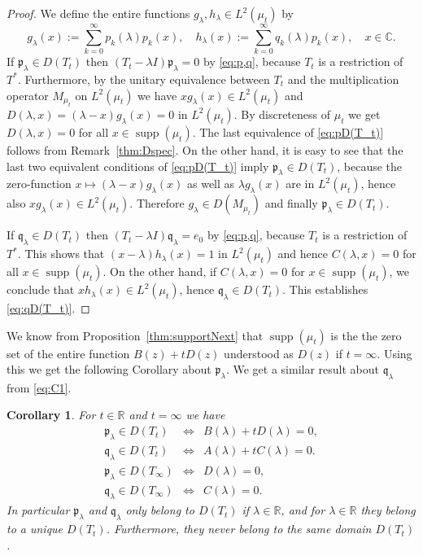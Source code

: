 \documentclass [12pt]{article}
\newtheorem{cor}[thm]{Corollary}
\DeclareMathOperator{\supp}{supp}
\newcommand{\C}{\mathbb{C}}
\newcommand{\R}{\mathbb{R}}
\newcommand{\la}{\lambda}
\begin{document}
\begin{proof} We define the entire functions $g_\la, h_\la\in L^2(\mu_t)$ by
$$
g_\la(x):=\sum_{k=0}^\infty p_k(\la)p_k(x),\quad h_\la(x):=\sum_{k=0}^\infty q_k(\la)p_k(x),\quad x\in\C.
$$
If $\mathfrak{p}_\la\in D(T_t)$ then $(T_t-\la I)\mathfrak{p}_\la=0$ by \eqref{eq:p,q}, because $T_t$ is a restriction of $T^*$. Furthermore, by the unitary equivalence between
$T_t$ and the multiplication operator $M_{\mu_t}$ on $L^2(\mu_t)$ we have $xg_\la(x)\in
L^2(\mu_t)$ and $D(\la,x)=(\la-x)g_\la(x)=0$ in $L^2(\mu_t)$. By discreteness of $\mu_t$ we get $D(\la,x)=0$ for all $x\in\supp(\mu_t)$. The last equivalence of \eqref{eq:pD(T_t)} follows from Remark~\ref{thm:Dspec}. On the other hand, it
is easy to see that the last two equivalent conditions of \eqref{eq:pD(T_t)} imply $\mathfrak{p}_\la\in D(T_t)$, because the zero-function $x\mapsto (\la-x)g_\la(x)$ as well as $\la g_\la(x)$ are in $L^2(\mu_t)$, hence also $xg_\la(x)\in L^2(\mu_t)$. Therefore $g_\la\in D(M_{\mu_t})$ and finally 
$\mathfrak{p}_\la\in D(T_t)$. 

If $\mathfrak{q}_\la\in D(T_t)$ then $(T_t-\la I)\mathfrak{q}_\la=e_0$ by \eqref{eq:p,q}, because $T_t$ is a restriction of $T^*$. This shows that $(x-\la)h_\la(x)=1$ in $L^2(\mu_t)$ and hence $C(\la,x)=0$ for all $x\in\supp(\mu_t)$. On the other hand, if $C(\la,x)=0$ for $x\in \supp(\mu_t)$, we conclude that $xh_\la(x)\in L^2(\mu_t)$, hence $\mathfrak{q}_\la\in D(T_t)$. This establishes \eqref{eq:qD(T_t)}.
\end{proof}

We know from Proposition~\ref{thm:supportNext} that $\supp(\mu_t)$ is the the zero set
of the entire function $B(z)+tD(z)$ understood as $D(z)$ if $t=\infty$. Using this we get the following Corollary about $\mathfrak{p}_\la$. We get a similar result about $\mathfrak{q}_\la$ from \eqref{eq:C1}.

\begin{cor}\label{thm:D(T_t)cor} For $t\in\R$ and $t=\infty$ we have
\begin{eqnarray*}
\mathfrak{p}_\la \in  D(T_t) &\iff &  B(\la)+tD(\la)=0,\\
\mathfrak{q}_\la \in  D(T_t) &\iff & A(\la)+tC(\la)=0.\\
\mathfrak{p}_\la \in  D(T_\infty) &\iff &  D(\la)=0,\\
\mathfrak{q}_\la \in  D(T_\infty) &\iff & C(\la)=0.
\end{eqnarray*}
In particular $\mathfrak{p}_\la$ and $\mathfrak{q}_\la$ only belong to $D(T_t)$ if 
$\la\in\R$, and for $\la\in\R$ they belong to a unique $D(T_t)$. Furthermore, they never belong to the same domain $D(T_t)$. 
\end{cor}
\end{document}
